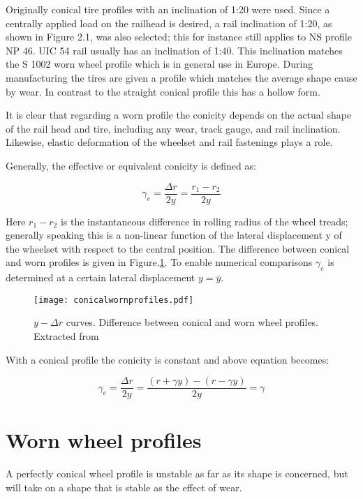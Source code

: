 Originally conical tire profiles with an inclination of 1:20 were used. Since a centrally applied load on the railhead is desired, a rail inclination of 1:20, as shown in Figure 2.1, was also selected; this for instance still applies to NS profile NP 46. UIC 54 rail usually has an inclination of 1:40. This inclination matches the S 1002 worn wheel profile which is in general use in Europe. During manufacturing the tires are given a profile which matches the average shape cause by wear. In contrast to the straight conical profile this has a hollow form.

It is clear that regarding a worn profile the conicity depends on the actual shape of the rail head and tire, including any wear, track gauge, and rail inclination. Likewise, elastic deformation of the wheelset and rail fastenings plays a role.

Generally, the effective or equivalent conicity is defined as:

$$ \gamma_e = \frac{\Delta r}{2y} = \frac{r_1 - r_2}{2y}  $$

Here $r_1 - r_2$ is the instantaneous difference in rolling radius of the wheel treads; generally speaking this is a non-linear function of the lateral displacement y of the wheelset with respect to the central position. The difference between conical and worn profiles is given in Figure.\ref{fig:conicalwornprofiles}. To enable numerical comparisons $\gamma_e$ is determined at a certain lateral displacement $y=\bar{y}$.


\begin{figure}[h！]
    \centering
    \texttt{[image: conicalwornprofiles.pdf]}
    \caption{$y-\Delta r$ curves. Difference between conical and worn wheel profiles. Extracted from \cite[2.4]{esveld2001modern}}
    \label{fig:conicalwornprofiles}
\end{figure}

With a conical profile the conicity is constant and above equation becomes:

$$ \gamma_e = \frac{\Delta r}{2y} =\frac{(r+\gamma y)-(r-\gamma y)}{2y} = \gamma $$


\section{Worn wheel profiles}

A perfectly conical wheel profile is unstable as far as its shape is concerned, but will take on a shape that is stable as the effect of wear.

